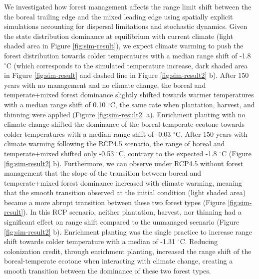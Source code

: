 We investigated how forest management affects the range limit shift
between the the boreal trailing edge and the mixed leading edge using
spatially explicit simulations accounting for dispersal limitations and
stochastic dynamics. Given the state distribution dominance at
equilibrium with current climate (light shaded area in Figure
\ref{fig:sim-result}), we expect climate warming to push the forest
distribution towards colder temperatures with a median range shift of
-1.8 \(^{\circ}\)C (which corresponds to the simulated temperature
increase, dark shaded area in Figure \ref{fig:sim-result} and dashed
line in Figure \ref{fig:sim-result2} b). After 150 years with no
management and no climate change, the boreal and temperate+mixed forest
dominance slightly shifted towards warmer temperatures with a median
range shift of 0.10 \(^{\circ}\)C, the same rate when plantation,
harvest, and thinning were applied (Figure \ref{fig:sim-result2} a).
Enrichment planting with no climate change shifted the dominance of the
boreal-temperate ecotone towards colder temperatures with a median range
shift of -0.03 \(^{\circ}\)C. After 150 years with climate warming
following the RCP4.5 scenario, the range of boreal and temperate+mixed
shifted only -0.53 \(^{\circ}\)C, contrary to the expected -1.8
\(^{\circ}\)C (Figure \ref{fig:sim-result2} b). Furthermore, we can
observe under RCP4.5 without forest management that the slope of the
transition between boreal and temperate+mixed forest dominance increased
with climate warming, meaning that the smooth transition observed at the
initial condition (light shaded area) became a more abrupt transition
between these two forest types (Figure \ref{fig:sim-result}). In this
RCP scenario, neither plantation, harvest, nor thinning had a
significant effect on range shift compared to the unmanaged scenario
(Figure \ref{fig:sim-result2} b). Enrichment planting was the single
practice to increase range shift towards colder temperature with a
median of -1.31 \(^{\circ}\)C. Reducing colonization credit, through
enrichment planting, increased the range shift of the boreal-temperate
ecotone when interacting with climate change, creating a smooth
transition between the dominance of these two forest types.\\

